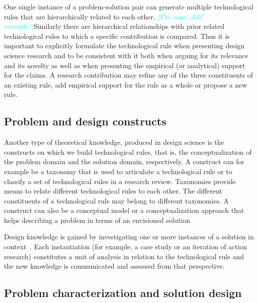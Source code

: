 \documentclass[graybox]{svmult}
\newcommand{\per}[1]{\textcolor{cyan}{{\it [Per says: #1]}}}
\newcommand{\per}[1]{}
\begin{document}
One single instance of a problem-solution pair can generate multiple technological rules that are hierarchically related to each other. \per{Add example?}Similarly there are hierarchical relationships with prior related technological rules to which a specific contribution is compared.
Thus it is important to explicitly formulate the technological rule when presenting design science research and to be consistent with it both when arguing for its relevance and its novelty as well as when presenting the empirical (or analytical) support for the claims.  A research contribution may refine any of the three constituents of an existing rule, add empirical support for the rule as a whole or propose a new rule.



\subsection{Problem and design constructs}
\label{sec:constructs}
Another type of theoretical knowledge, produced in design science is the 
constructs on which we build technological rules, that is, the conceptualization of the problem domain and the solution domain, respectively.  
A construct can for example be a taxonomy that is used to articulate a technological rule or to classify a set of technological rules in a research review. Taxonomies provide means to relate different technological rules to each other. The different constituents of a technological rule may belong to different taxonomies. A construct can also be a conceptual model or a conceptualization approach that helps describing a problem in terms of an envisioned solution

Design knowledge is gained by investigating one or more instances of a solution in context~\cite{wieringa_what_2014}. Each instantiation (for example, a case study or an iteration of action research) constitutes a unit of analysis in relation to the technological rule and the new knowledge is communicated and assessed from that perspective. 

\subsection{Problem characterization and solution design}


\end{document}
